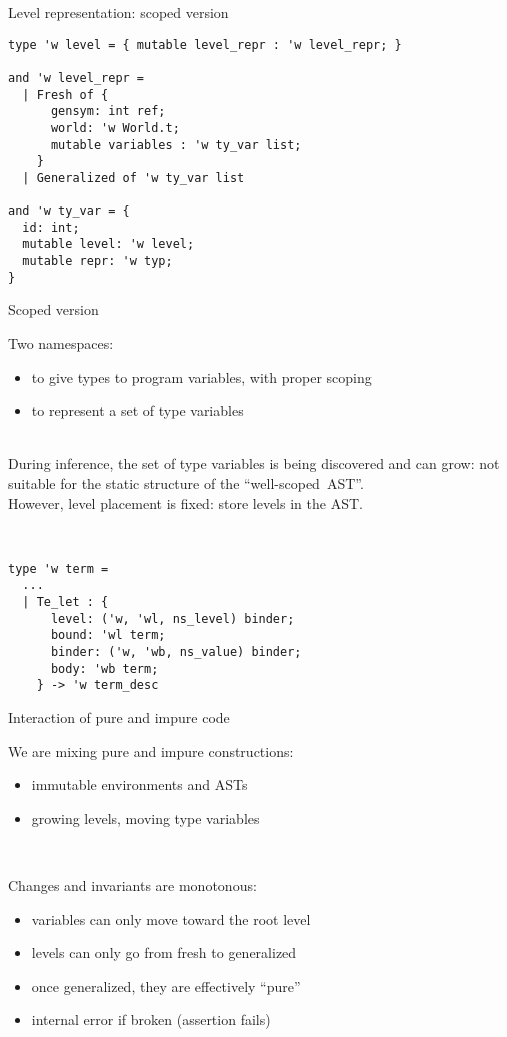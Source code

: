 \documentclass{beamer}          %
\begin{document}
\begin{frame}[fragile]{Level representation: scoped version}

\begin{lstlisting}
type 'w level = { mutable level_repr : 'w level_repr; }

and 'w level_repr =
  | Fresh of {
      gensym: int ref;
      world: 'w World.t;
      mutable variables : 'w ty_var list;
    }
  | Generalized of 'w ty_var list

and 'w ty_var = {
  id: int;
  mutable level: 'w level;
  mutable repr: 'w typ;
}
\end{lstlisting}

\end{frame}

\begin{frame}[fragile]{Scoped version}

  Two namespaces:
  \begin{itemize}
    \setlength{\itemindent}{3em}
    \item[ns\_value] to give types to program variables, with proper scoping
    \item[ns\_level] to represent a set of type variables
  \end{itemize}
  \pause ~\\
  During inference, the set of type variables is being discovered and can grow: not suitable for the static structure of the ``well-scoped~AST''. \\
  However, level placement is fixed: store levels in the AST.

\pause ~\\
\begin{lstlisting}
type 'w term =
  ...
  | Te_let : {
      level: ('w, 'wl, ns_level) binder;
      bound: 'wl term;
      binder: ('w, 'wb, ns_value) binder;
      body: 'wb term;
    } -> 'w term_desc
\end{lstlisting}

\end{frame}

\begin{frame}[fragile]{Interaction of pure and impure code}

  We are mixing pure and impure constructions:
  \begin{itemize}
    \item immutable environments and ASTs
    \item growing levels, moving type variables
  \end{itemize}

  \pause ~\

  Changes and invariants are monotonous:
  \begin{itemize}
    \item variables can only move toward the root level
    \item levels can only go from fresh to generalized
    \item once generalized, they are effectively ``pure''
    \item[$\Rightarrow$] internal error if broken (assertion fails)
  \end{itemize}

\end{frame}
\end{document}
